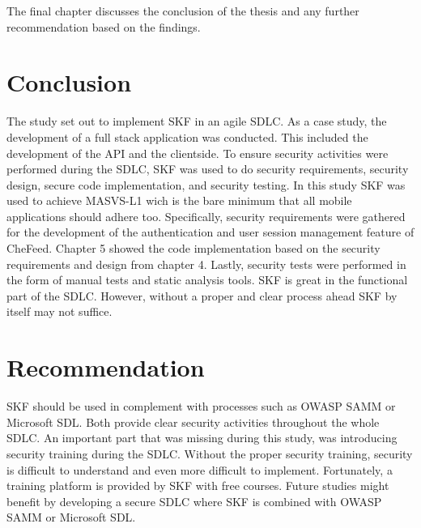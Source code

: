 The final chapter discusses the conclusion of the thesis and any further recommendation based on the findings.

\section{Conclusion}
The study set out to implement SKF in an agile SDLC. As a case study, the development of a full stack application was conducted. This included the development of the API and the clientside. To ensure security activities were performed during the SDLC, SKF was used to do security requirements, security design, secure code implementation, and security testing. In this study SKF was used to achieve MASVS-L1 wich is the bare minimum that all mobile applications should adhere too. Specifically, security requirements were gathered for the development of the authentication and user session management feature of CheFeed. Chapter 5 showed the code implementation based on the security requirements and design from chapter 4. Lastly, security tests were performed in the form of manual tests and static analysis tools. SKF is great in the functional part of the SDLC. However, without a proper and clear process ahead SKF by itself may not suffice. 

\section{Recommendation}
SKF should be used in complement with processes such as OWASP SAMM or Microsoft SDL. Both provide clear security activities throughout the whole SDLC. An important part that was missing during this study, was introducing security training during the SDLC. Without the proper security training, security is difficult to understand and even more difficult to implement. Fortunately, a training platform is provided by SKF with free courses. Future studies might benefit by developing a secure SDLC where SKF is combined with OWASP SAMM or Microsoft SDL.


